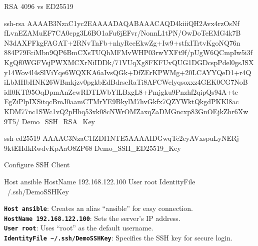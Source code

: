\documentclass[aspectratio=169,12pt]{beamer}
\begin{document}
\begin{frame}[fragile]{RSA 4096 vs ED25519}
\begin{termsmall}
ssh-rsa AAAAB3NzaC1yc2EAAAADAQABAAACAQD4kiiiQH2Avx4rzOsNf
fLvnEZAMuEF7CA0cpg3L6BO1aFu6jEFvr/NonnL1tPN/OwDoTeEMG4k7B
N3dAXFFkgFAGAT+2RNvTnFb+nhyReeEkwZg+Iw9+stfxITrtvKgoNQ76n
884P79FciMbn9QP6BmCXsTUQhMFMvWHP03rwYXFt9f/pUgW6QCmpIw5i3f
KgQf0WGFVsjPWXMCXrNiIDDk/71VUqXg8FKFUvQUG1DGDcspPdel0gsJSX
y14Wov4l4sSlViYqe6WQXKA6aIvsQGk+DfZErKPWMg+20LCAYYQeD1+r4Q
iLbMHbHNK26WBmkjzv0pgkbEdBdrscRaTi8AFCWelyqsoxxz4GEK0CG7NoB
idl0KTf95OqDpmAnZcwRDTLWbYlLBxgL8+Pmjgku9Pnzhf2qipQs94A+te
EgZiPlpIXSitqcBmJ0aamCTMrYE9BkylM7hvGkfx7QZYWktQkgdPKKl8ac
KDM77nc1SWc1vQ2pHhq53xk08cNWrOMZaxqZaDMGncxp83GnOEjkZhr6Xw
9T5/ Demo_SSH_RSA_Key
\end{termsmall}
\vspace{0.2cm}
\begin{term}
ssh-ed25519 AAAAC3NzaC1lZDI1NTE5AAAAIDGwqTc2eyAVxspuLyNERj
9ktEHdkRwdvKpAaO8ZP68 Demo_SSH_ED25519_Key
\end{term}
\end{frame}

\begin{frame}[fragile]{Configure SSH Client}
\begin{codessh}
Host ansible
    HostName 192.168.122.100
    User root
    IdentityFile ~/.ssh/DemoSSHKey
\end{codessh}
\vspace{0.3cm}
\textbf{\texttt{Host ansible}}: Creates an alias ``ansible'' for easy connection.\\[0.2cm]
\textbf{\texttt{HostName 192.168.122.100}}: Sets the server's IP address.\\[0.2cm]
\textbf{\texttt{User root}}: Uses ``root'' as the default username.\\[0.2cm]
\textbf{\texttt{IdentityFile \textasciitilde/.ssh/DemoSSHKey}}: Specifies the SSH key for secure login.
\end{frame}
\end{document}
